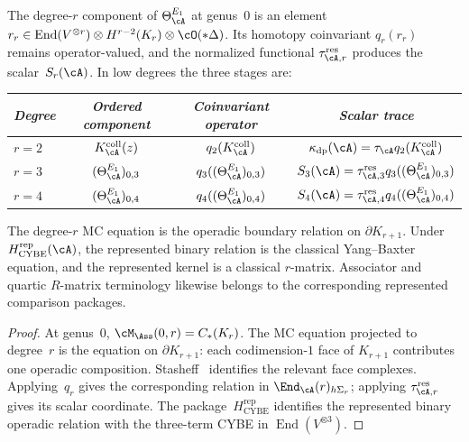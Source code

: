 \begin{proposition}
\label{prop:e1-shadow-r-matrix}
The degree-$r$ component of $\Theta_\cA^{E_1}$ at genus~$0$ is an
element $r_r \in
\operatorname{End}(V^{\otimes r}) \otimes H^{r-2}(K_r)
\otimes \cO(*\Delta)$.  Its homotopy coinvariant
$q_r(r_r)$ remains operator-valued, and the normalized functional
$\tau_{\cA,r}^{\mathrm{res}}$ produces the scalar~$S_r(\cA)$.
In low degrees the three stages are\textup{:}
\begin{center}
\renewcommand{\arraystretch}{1.15}
\begin{tabular}{lccc}
\toprule
\emph{Degree} & \emph{Ordered component} & \emph{Coinvariant operator}
& \emph{Scalar trace} \\
\midrule
$r = 2$ & $K_\cA^{\mathrm{coll}}(z)$
 & $q_2(K_\cA^{\mathrm{coll}})$
 & $\kappa_{\mathrm{dp}}(\cA)=\tau_\cA q_2(K_\cA^{\mathrm{coll}})$ \\
$r = 3$ & $(\Theta_\cA^{E_1})_{0,3}$
 & $q_3((\Theta_\cA^{E_1})_{0,3})$
 & $S_3(\cA)=\tau_{\cA,3}^{\mathrm{res}}q_3((\Theta_\cA^{E_1})_{0,3})$ \\
$r = 4$ & $(\Theta_\cA^{E_1})_{0,4}$
 & $q_4((\Theta_\cA^{E_1})_{0,4})$
 & $S_4(\cA)=\tau_{\cA,4}^{\mathrm{res}}q_4((\Theta_\cA^{E_1})_{0,4})$ \\
\bottomrule
\end{tabular}
\end{center}
The degree-$r$ MC equation is the operadic boundary relation on
$\partial K_{r+1}$.  Under~$H_{\mathrm{CYBE}}^{\mathrm{rep}}(\cA)$,
the represented binary relation is the classical Yang--Baxter
equation, and the represented kernel is a classical $r$-matrix.
Associator and quartic $R$-matrix terminology likewise belongs to the
corresponding represented comparison packages.
\end{proposition}

\begin{proof}
At genus~$0$, $\cM_\Ass(0,r) = C_*(K_r)$. The MC equation
projected to degree~$r$ is the equation on
$\partial K_{r+1}$: each codimension-$1$ face of $K_{r+1}$
contributes one operadic composition.  Stasheff~\cite{Sta63} identifies
the relevant face complexes.  Applying~$q_r$ gives the corresponding
relation in $\End_\cA(r)_{h\Sigma_r}$; applying
$\tau_{\cA,r}^{\mathrm{res}}$ gives its scalar coordinate.  The
package~$H_{\mathrm{CYBE}}^{\mathrm{rep}}$ identifies the represented
binary operadic relation with the three-term CYBE in
$\operatorname{End}(V^{\otimes3})$.
\end{proof}


